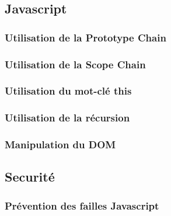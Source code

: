\documentclass[a4paper]{article}
\begin{document}
	\subsection{Javascript} 
		\subsubsection{Utilisation de la Prototype Chain}
		\subsubsection{Utilisation de la Scope Chain}
		\subsubsection{Utilisation du mot-clé this}
		\subsubsection{Utilisation de la récursion}
		\subsubsection{Manipulation du DOM}
   \subsection{Securité} 
  		\subsubsection{Prévention des failles Javascript}
\end{document}
